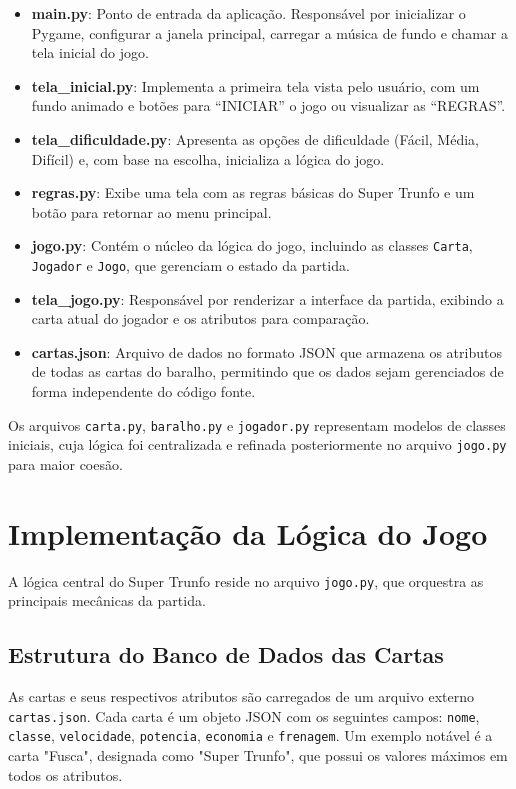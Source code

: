 \documentclass[a4paper, twocolumn]{article}
\begin{document}
\begin{itemize}
    \item \textbf{main.py}: Ponto de entrada da aplicação. Responsável por inicializar o Pygame, configurar a janela principal, carregar a música de fundo e chamar a tela inicial do jogo.
    
    \item \textbf{tela\_inicial.py}: Implementa a primeira tela vista pelo usuário, com um fundo animado e botões para ``INICIAR'' o jogo ou visualizar as ``REGRAS''.
    
    \item \textbf{tela\_dificuldade.py}: Apresenta as opções de dificuldade (Fácil, Média, Difícil) e, com base na escolha, inicializa a lógica do jogo.
    
    \item \textbf{regras.py}: Exibe uma tela com as regras básicas do Super Trunfo e um botão para retornar ao menu principal.
    
    \item \textbf{jogo.py}: Contém o núcleo da lógica do jogo, incluindo as classes \texttt{Carta}, \texttt{Jogador} e \texttt{Jogo}, que gerenciam o estado da partida.
    
    \item \textbf{tela\_jogo.py}: Responsável por renderizar a interface da partida, exibindo a carta atual do jogador e os atributos para comparação.
    
    \item \textbf{cartas.json}: Arquivo de dados no formato JSON que armazena os atributos de todas as cartas do baralho, permitindo que os dados sejam gerenciados de forma independente do código fonte.
\end{itemize}

Os arquivos \texttt{carta.py}, \texttt{baralho.py} e \texttt{jogador.py} representam modelos de classes iniciais, cuja lógica foi centralizada e refinada posteriormente no arquivo \texttt{jogo.py} para maior coesão.

\section{Implementação da Lógica do Jogo}
A lógica central do Super Trunfo reside no arquivo \texttt{jogo.py}, que orquestra as principais mecânicas da partida.

\subsection{Estrutura do Banco de Dados das Cartas}
As cartas e seus respectivos atributos são carregados de um arquivo externo \texttt{cartas.json}. Cada carta é um objeto JSON com os seguintes campos: \texttt{nome}, \texttt{classe}, \texttt{velocidade}, \texttt{potencia}, \texttt{economia} e \texttt{frenagem}. Um exemplo notável é a carta "Fusca", designada como "Super Trunfo", que possui os valores máximos em todos os atributos.
\end{document}
